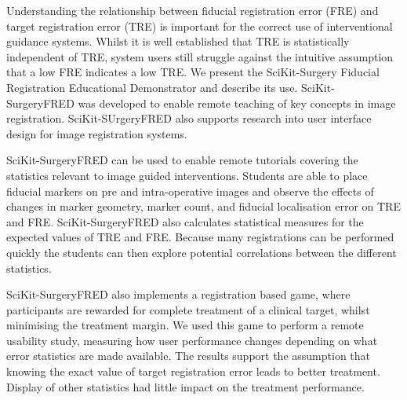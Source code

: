 Understanding the relationship between fiducial registration error (FRE) and target registration error (TRE) is important for the correct use of interventional guidance systems. Whilst it is well established that TRE is statistically independent of TRE, system users still struggle against the intuitive assumption that a low FRE indicates a low TRE. We present the SciKit-Surgery Fiducial Registration Educational Demonstrator and describe its use. SciKit-SurgeryFRED was developed to enable remote teaching of key concepts in image registration. SciKit-SUrgeryFRED also supports research into user interface design for image registration systems. 

SciKit-SurgeryFRED can be used to enable remote tutorials covering the statistics relevant to image guided interventions. Students are able to place fiducial markers on pre and intra-operative images and observe the effects of changes in marker geometry, marker count, and fiducial localisation error on TRE and FRE. SciKit-SurgeryFRED also calculates statistical measures for the expected values of TRE and FRE. Because many registrations can be performed quickly the students can then explore potential correlations between the different statistics. 

SciKit-SurgeryFRED also implements a registration based game, where participants are rewarded for complete treatment of a clinical target, whilst minimising the treatment margin. We used this game to perform a remote usability study, measuring how user performance changes depending on what error statistics are made available. The results support the assumption that knowing the exact value of target registration error leads to better treatment. Display of other statistics had little impact on the treatment performance.  
